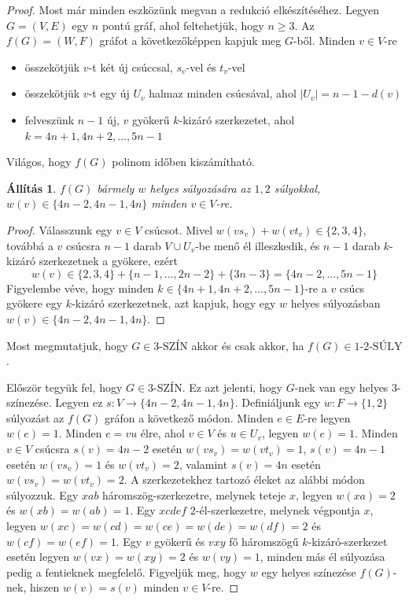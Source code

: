 \documentclass[12pt, a4paper]{report}
\newtheorem{áll}[tét]{Állítás}
\theoremstyle{remark}
\theoremstyle{definition}
\begin{document}
\begin{proof}
Most már minden eszközünk megvan a redukció elkészítéséhez. Legyen $G = (V, E)$ egy $n$ pontú gráf, ahol feltehetjük, hogy $n \geq 3$. Az $f(G) = (W, F)$ gráfot a következőképpen kapjuk meg $G$-ből. Minden $v \in V$-re
\begin{itemize}
\item összekötjük $v$-t két új csúccsal, $s_v$-vel és $t_v$-vel
\item összekötjük $v$-t egy új $U_v$ halmaz minden csúcsával, ahol $|U_v| = n - 1 - d(v)$
\item felveszünk $n - 1$ új, $v$ gyökerű $k$-kizáró szerkezetet, ahol $k = 4n + 1, 4n + 2, \ldots, 5n - 1$
\end{itemize}

Világos, hogy $f(G)$ polinom időben kiszámítható.

\begin{áll} \label{áll:npreduct}
$f(G)$ bármely $w$ helyes súlyozására az $1, 2$ súlyokkal, $w(v) \in \lbrace 4n - 2, 4n - 1, 4n \rbrace$ minden $v \in V$-re.
\end{áll}

\begin{proof}
Válasszunk egy $v \in V$ csúcsot. Mivel $w(vs_v) + w(vt_v) \in \lbrace 2, 3, 4 \rbrace$, továbbá a $v$ csúcsra $n - 1$ darab $V \cup U_v$-be menő él illeszkedik, és $n - 1$ darab $k$-kizáró szerkezetnek a gyökere, ezért
\begin{equation*}
w(v) \in \lbrace 2, 3, 4 \rbrace + \lbrace n - 1, \ldots, 2n - 2 \rbrace + \lbrace 3n - 3 \rbrace = \lbrace 4n - 2, \ldots, 5n - 1 \rbrace
\end{equation*}
Figyelembe véve, hogy minden $k \in \lbrace 4n + 1, 4n + 2, \ldots, 5n - 1 \rbrace$-re a $v$ csúcs gyökere egy $k$-kizáró szerkezetnek, azt kapjuk, hogy egy $w$ helyes súlyozásban $w(v) \in \lbrace 4n - 2, 4n - 1, 4n \rbrace$.
\end{proof}

Most megmutatjuk, hogy $G \in \textrm{3-SZÍN}$ akkor és csak akkor, ha $f(G) \in \textrm{1-2-SÚLY}$.

Először tegyük fel, hogy $G \in \textrm{3-SZÍN}$. Ez azt jelenti, hogy $G$-nek van egy helyes $3$-színezése. Legyen ez $s: V \rightarrow \lbrace 4n - 2, 4n - 1, 4n \rbrace$. Definiáljunk egy $w: F \rightarrow \lbrace 1, 2 \rbrace$ súlyozást az $f(G)$ gráfon a következő módon. Minden $e \in E$-re legyen $w(e) = 1$. Minden $e = vu$ élre, ahol $v \in V$ és $u \in U_v$, legyen $w(e) = 1$. Minden $v \in V$ csúcsra $s(v) = 4n - 2$ esetén $w(vs_v) = w(vt_v) = 1$, $s(v) = 4n - 1$ esetén $w(vs_v) = 1$ és $w(vt_v) = 2$, valamint $s(v) = 4n$ esetén $w(vs_v) = w(vt_v) = 2$. A szerkezetekhez tartozó éleket az alábbi módon súlyozzuk. Egy $xab$ háromszög-szerkezetre, melynek teteje $x$, legyen $w(xa) = 2$ és $w(xb) = w(ab) = 1$. Egy $xcdef$ $2$-él-szerkezetre, melynek végpontja $x$, legyen $w(xc) = w(cd) = w(ce) = w(de) = w(df) = 2$ és $w(cf) = w(ef) = 1$. Egy $v$ gyökerű és $vxy$ fő háromszögű $k$-kizáró-szerkezet esetén legyen $w(vx) = w(xy) = 2$ és $w(vy) = 1$, minden más él súlyozása pedig a fentieknek megfelelő. Figyeljük meg, hogy $w$ egy helyes színezése $f(G)$-nek, hiszen $w(v) = s(v)$ minden $v \in V$-re.


\end{proof}
\end{document}
